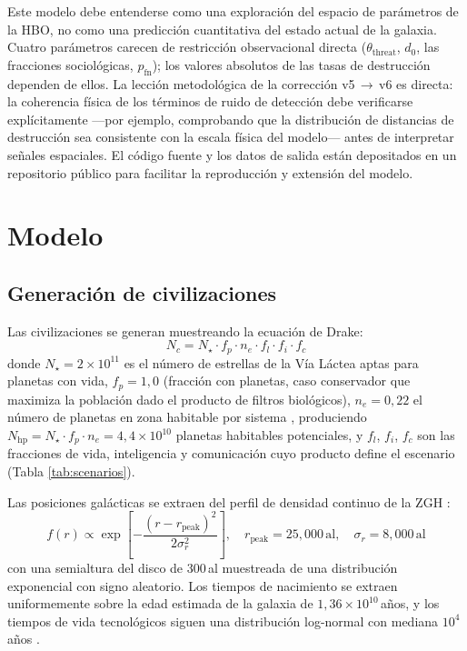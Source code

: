 \documentclass[useAMS,usenatbib,onecolumn]{mn2e}
\begin{document}
Este modelo debe entenderse como una exploración del espacio de
parámetros de la HBO, no como una predicción cuantitativa del estado
actual de la galaxia.
Cuatro parámetros carecen de restricción observacional directa
($\theta_\text{threat}$, $d_0$, las fracciones sociológicas,
$p_\text{fn}$); los valores absolutos de las tasas de destrucción
dependen de ellos.
La lección metodológica de la corrección v5\,$\to$\,v6 es directa: la
coherencia física de los términos de ruido de detección debe
verificarse explícitamente —por ejemplo, comprobando que la
distribución de distancias de destrucción sea consistente con la
escala física del modelo— antes de interpretar señales espaciales.
El código fuente y los datos de salida están depositados en un
repositorio público para facilitar la reproducción y extensión del
modelo.

\section{Modelo}
\label{sec:model}

\subsection{Generación de civilizaciones}
\label{sec:civgen}

Las civilizaciones se generan muestreando la ecuación de Drake:
\begin{equation}
  N_c = N_\star \cdot f_p \cdot n_e \cdot f_l \cdot f_i \cdot f_c
  \label{eq:drake}
\end{equation}
donde $N_\star = 2\times10^{11}$ es el número de estrellas de la Vía
Láctea aptas para planetas con vida, $f_p = 1{,}0$ (fracción con
planetas, caso conservador que maximiza la población dado el producto
de filtros biológicos), $n_e = 0{,}22$ el número de planetas en zona
habitable por sistema \citep{fressin2013}, produciendo
$N_\text{hp} = N_\star \cdot f_p \cdot n_e = 4{,}4\times10^{10}$
planetas habitables potenciales, y $f_l$, $f_i$, $f_c$ son las
fracciones de vida, inteligencia y comunicación cuyo producto define el
escenario (Tabla \ref{tab:scenarios}).

Las posiciones galácticas se extraen del perfil de densidad continuo de
la ZGH \citep{lineweaver2004}:
\begin{equation}
  f(r) \propto \exp\!\left[-\frac{(r - r_\text{peak})^2}{2\sigma_r^2}\right],
  \quad r_\text{peak} = 25{,}000\,\text{al},\quad \sigma_r = 8{,}000\,\text{al}
  \label{eq:ghz}
\end{equation}
con una semialtura del disco de 300\,al muestreada de una distribución
exponencial con signo aleatorio.
Los tiempos de nacimiento se extraen uniformemente sobre la edad
estimada de la galaxia de $1{,}36\times10^{10}$\,años, y los tiempos
de vida tecnológicos siguen una distribución log-normal con mediana
$10^4$\,años \citep{sandberg2018}.
\end{document}
